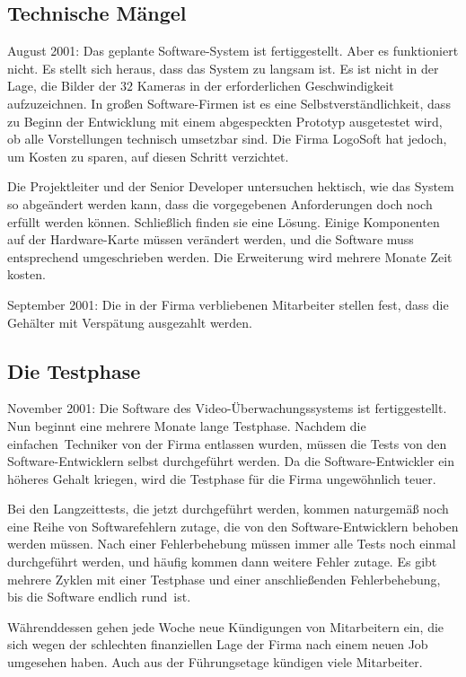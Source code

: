 \subsection{Technische Mängel}

August 2001: Das geplante Software-System ist fertiggestellt. Aber es
funktioniert nicht. Es stellt sich heraus, dass das System zu langsam ist. Es
ist nicht in der Lage, die Bilder der $32$ Kameras in der erforderlichen
Geschwindigkeit aufzuzeichnen. In großen Software-Firmen ist es eine
Selbstverständlichkeit, dass zu Beginn der Entwicklung mit einem abgespeckten
Prototyp ausgetestet wird, ob alle Vorstellungen technisch umsetzbar sind. Die
Firma LogoSoft hat jedoch, um Kosten zu sparen, auf diesen Schritt verzichtet.

Die Projektleiter und der Senior Developer untersuchen hektisch, wie das System
so abgeändert werden kann, dass die vorgegebenen Anforderungen doch noch
erfüllt werden können. Schließlich finden sie eine Lösung. Einige Komponenten
auf der Hardware-Karte müssen verändert werden, und die Software muss
entsprechend umgeschrieben werden. Die Erweiterung wird mehrere Monate Zeit
kosten.

September 2001: Die in der Firma verbliebenen Mitarbeiter stellen fest, dass
die Gehälter mit Verspätung ausgezahlt werden.


\subsection{Die Testphase}

November 2001: Die Software des Video-Überwachungssystems ist fertiggestellt.
Nun beginnt eine mehrere Monate lange Testphase. Nachdem die \glqq
einfachen\grqq\ Techniker von der Firma entlassen wurden, müssen die Tests von
den Software-Entwicklern selbst durchgeführt werden. Da die Software-Entwickler
ein höheres Gehalt kriegen, wird die Testphase für die Firma ungewöhnlich teuer.

Bei den Langzeittests, die jetzt durchgeführt werden, kommen naturgemäß noch
eine Reihe von Softwarefehlern zutage, die von den Software-Entwicklern behoben
werden müssen. Nach einer Fehlerbehebung müssen immer alle Tests noch einmal
durchgeführt werden, und häufig kommen dann weitere Fehler zutage. Es gibt
mehrere Zyklen mit einer Testphase und einer anschließenden Fehlerbehebung, bis
die Software endlich \glqq rund\grqq\ ist.

Währenddessen gehen jede Woche neue Kündigungen von Mitarbeitern ein, die sich
wegen der schlechten finanziellen Lage der Firma nach einem neuen Job umgesehen
haben. Auch aus der Führungsetage kündigen viele Mitarbeiter.


